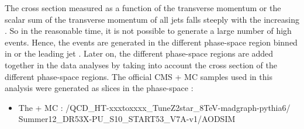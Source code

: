 The cross section measured as a function of the transverse momentum \pt or the scalar sum of the transverse momentum of all jets \HT falls 
steeply with the increasing \pt. So in the reasonable time, it is not possible to generate a large number of high \pt events. Hence, the 
events are generated in the different phase-space region binned in \HT or the leading jet \pt. Later on, the different phase-space regions 
are added together in the data analyses by taking into account the cross section of the different phase-space regions. The official CMS 
\MadGraphF + \PYTHIAS MC samples used in this analysis were generated as slices in the \HT phase-space :
\begin{center}
\begin{itemize}
\item The \MadGraphF + \PYTHIAS MC : /QCD\_HT-xxxtoxxxx\_TuneZ2star\_8TeV-madgraph-pythia6/\\Summer12\_DR53X-PU\_S10\_START53\_V7A-v1/AODSIM
\end{itemize}
\end{center}


